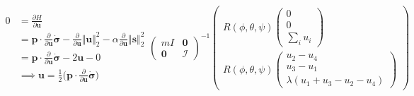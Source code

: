 \documentclass{article}
\begin{document}
\begin{equation}
\begin{aligned}
    0 
    &= \frac{\partial H}{\partial \bm{u}} \\
    &= \bm{p} \cdot \frac{\partial}{\partial \bm{u}} \dot{\bm{\sigma}}
        - \frac{\partial}{\partial \bm{u}} \Vert \bm{u} \Vert_2^2
        - \alpha \frac{\partial}{\partial \bm{u}} \Vert \bm{s} \Vert_2^2 \\
    &= \bm{p} \cdot \frac{\partial}{\partial \bm{u}} \dot{\bm{\sigma}}
        - 2 \bm{u}
        - 0 \\
    &\implies \bm{u} = \frac{1}{2} \Big( \bm{p} \cdot \frac{\partial}{\partial \bm{u}} \dot{\bm{\sigma}} \Big)
\end{aligned}\begin{pmatrix}
    m I & \mathbf{0} \\
    \mathbf{0} & \mathcal{I}
\end{pmatrix}^{-1}
\begin{pmatrix}
    R(\phi, \theta, \psi) \begin{pmatrix} 
        0 \\ 
        0 \\ 
        \sum_{i} u_i
    \end{pmatrix} \\
    R(\phi, \theta, \psi) \begin{pmatrix}
        u_2 - u_4 \\ 
        u_3 - u_1 \\ 
        \lambda(u_1 + u_3 - u_2 - u_4) 
    \end{pmatrix}
\end{pmatrix}
\end{equation}
\end{document}
